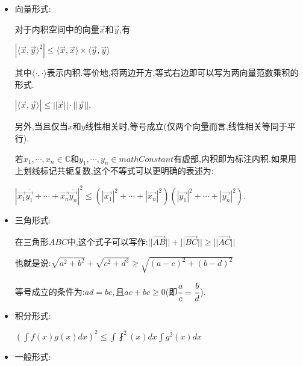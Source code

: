 \documentclass[UTF8,12pt]{ctexbook}
\newcommand{\upDownSum}[2]{\sum\limits_{#2}^{#1}}
\newcommand{\upDownProd}[2]{\prod\limits_{#2}^{#1}}
\newcommand{\defFunction}[1]{f(#1)}
\newcommand{\mathConstant}{\mathbb{C}}
\newcommand{\bigCase}[1]{\left(#1\right)}
\newcommand{\innerProduct}[2]{\langle#1,#2\rangle}
\begin{document}
{{{{\begin{itemize}
{          当且仅当$ab = cd$(即$\cfrac{a}{c} = \cfrac{b}{d}$)时.

          一般形式为$\upDownSum{n}{i = 1}a_i^2\upDownSum{n}{i = 1}b_i^2\geq\bigCase{\upDownSum{n}{i = 1}a_ib_i)}^2$

          当$\cfrac{a_1}{b_1} = \cfrac{a_2}{b_2} = \dots = \cfrac{a_n}{b_n}$或$a_i,b_i,i = 1,2,3,\dots,n$中至少有一方全为$0$时等号成立.

          一般形式推广:$(x_1 + y_1 + \dots)(x_2 + y_2 + \dots)\dots(x_n + y_n + \dots) \geq \left[\bigCase{\upDownProd{n}{i = 1}x_i}^{\cfrac{1}{n}} + \bigCase{\upDownProd{n}{i = 1}y_i}^{\cfrac{1}{n}} + \dots\right]^n$

          此推广形式又称卡尔松不等式,其表述是:在m×n矩阵中,各列元素之和的几何平均不小于各行元素的几何平均之和.二维形式是卡尔松不等式n=2时的特殊情况.
          }
    \item {
          向量形式:

          对于内积空间中的向量$\vec{x}$和$\vec{y}$,有

          $|\innerProduct{\vec{x}}{\vec{y}}^2| \leq \innerProduct{\vec{x}}{\vec{x}} \times \innerProduct{\vec{y}}{\vec{y}}$

          其中$\innerProduct{\cdot}{\cdot}$表示内积.等价地,将两边开方,等式右边即可以写为两向量范数乘积的形式.

          $|\innerProduct{\vec{x}}{\vec{y}}| \leq ||\vec{x}||\cdot||\vec{y}||$.

          另外,当且仅当$x$和$y$线性相关时,等号成立(仅两个向量而言,线性相关等同于平行).

          若$x_1,\dotsm,x_n \in \mathConstant$和$y_1,\dotsm,y_n \in mathConstant$有虚部,内积即为标注内积.如果用上划线标记共轭复数,这个不等式可以更明确的表述为:

          $|\vec{x_1}\bar{\vec{y_1}} + \dotsm + \vec{x_n}\bar{\vec{y_n}}|^2\leq (|\vec{x_1}|^2 + \dotsm + |\vec{x_n}|^2)(|\vec{y_1}|^2 + \dotsm + |\vec{y_n}|^2)$.
          }
    \item {
          三角形式:

          在三角形$ABC$中,这个式子可以写作:$||\vec{AB}|| + ||\vec{BC}|| \geq ||\vec{AC}||$

          也就是说:$\sqrt{a^2 + b^2} + \sqrt{c^2 + d^2} \geq \sqrt{(a - c)^2 + (b - d)^2}$

          等号成立的条件为:$ad = bc,且ac + bc \geq 0$(即$\cfrac{a}{c} = \cfrac{b}{d}$).
          }
    \item {
          积分形式:

          $\bigCase{\int\defFunction{x}g(x)dx}^2 \leq \int\fint^2(x)dx \int g^2(x)dx$
          }
    \item {
          一般形式:

}
\end{itemize}}}}}
\end{document}
